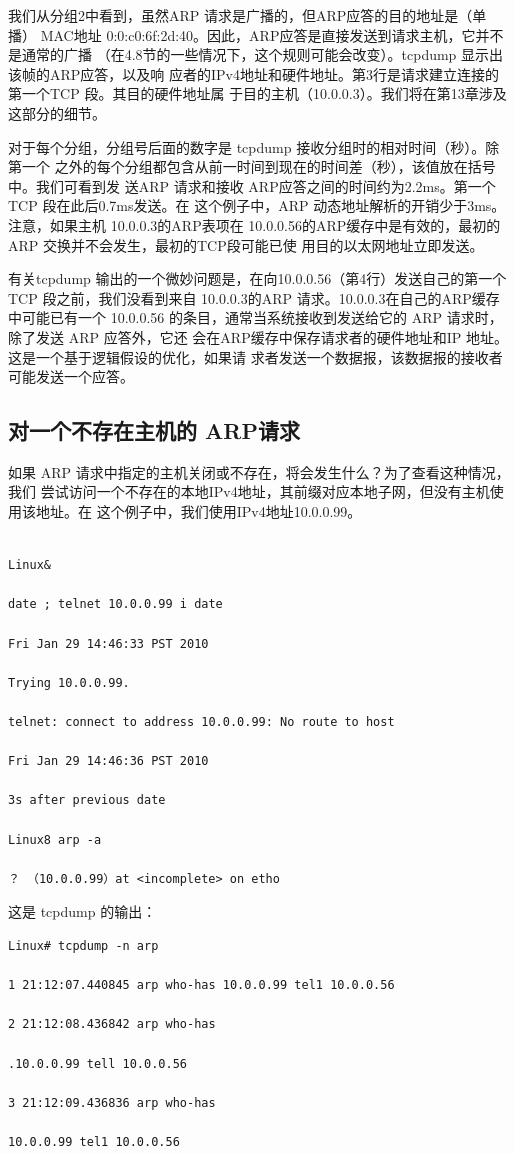 我们从分组2中看到，虽然ARP 请求是广播的，但ARP应答的目的地址是（单播）
MAC地址 0:0:c0:6f:2d:40。因此，ARP应答是直接发送到请求主机，它并不是通常的广播
（在4.8节的一些情况下，这个规则可能会改变）。tcpdump 显示出该帧的ARP应答，以及响
应者的IPv4地址和硬件地址。第3行是请求建立连接的第一个TCP 段。其目的硬件地址属
于目的主机（10.0.0.3）。我们将在第13章涉及这部分的细节。

对于每个分组，分组号后面的数字是 tcpdump 接收分组时的相对时间（秒）。除第一个
之外的每个分组都包含从前一时间到现在的时间差（秒），该值放在括号中。我们可看到发
送ARP 请求和接收 ARP应答之间的时间约为2.2ms。第一个TCP 段在此后0.7ms发送。在
这个例子中，ARP 动态地址解析的开销少于3ms。注意，如果主机 10.0.0.3的ARP表项在
10.0.0.56的ARP缓存中是有效的，最初的ARP 交换并不会发生，最初的TCP段可能已使
用目的以太网地址立即发送。

有关tcpdump 输出的一个微妙问题是，在向10.0.0.56（第4行）发送自己的第一个 TCP
段之前，我们没看到来自 10.0.0.3的ARP 请求。10.0.0.3在自己的ARP缓存中可能已有一个
10.0.0.56 的条目，通常当系统接收到发送给它的 ARP 请求时，除了发送 ARP 应答外，它还
会在ARP缓存中保存请求者的硬件地址和IP 地址。这是一个基于逻辑假设的优化，如果请
求者发送一个数据报，该数据报的接收者可能发送一个应答。

\subsection{对一个不存在主机的 ARP请求}

如果 ARP 请求中指定的主机关闭或不存在，将会发生什么？为了查看这种情况，我们
尝试访问一个不存在的本地IPv4地址，其前缀对应本地子网，但没有主机使用该地址。在
这个例子中，我们使用IPv4地址10.0.0.99。

\begin{verbatim}
    
Linux&

date ; telnet 10.0.0.99 i date

Fri Jan 29 14:46:33 PST 2010

Trying 10.0.0.99.

telnet: connect to address 10.0.0.99: No route to host

Fri Jan 29 14:46:36 PST 2010

3s after previous date

Linux8 arp -a

？ （10.0.0.99）at <incomplete> on etho
\end{verbatim}
这是 tcpdump 的输出：
\begin{verbatim}
Linux# tcpdump -n arp

1 21:12:07.440845 arp who-has 10.0.0.99 tel1 10.0.0.56

2 21:12:08.436842 arp who-has

.10.0.0.99 tell 10.0.0.56

3 21:12:09.436836 arp who-has

10.0.0.99 tel1 10.0.0.56
\end{verbatim}


